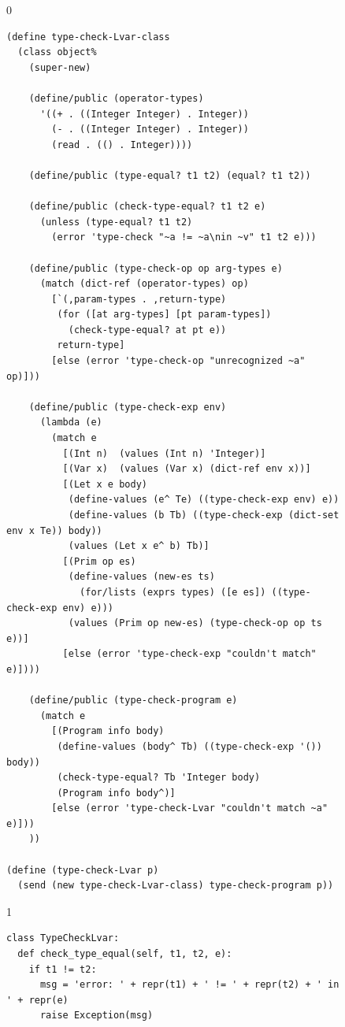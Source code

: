 \documentclass[7x10]{TimesAPriori_MIT}%
\def\racketEd{0}
\def\pythonEd{1}
\providecommand{\BookEdition}{1}
\let\edition\BookEdition
\newcommand{\pythonColor}[0]{}
\numberwithin{theorem}{chapter}
\numberwithin{definition}{chapter}
\numberwithin{equation}{chapter}
\begin{document}
\begin{figure}[tbp]
\begin{tcolorbox}[colback=white]
{\if\edition\racketEd  
\begin{lstlisting}[basicstyle=\ttfamily\footnotesize]
(define type-check-Lvar-class
  (class object%
    (super-new)

    (define/public (operator-types)
      '((+ . ((Integer Integer) . Integer))
        (- . ((Integer Integer) . Integer))
        (read . (() . Integer))))

    (define/public (type-equal? t1 t2) (equal? t1 t2))

    (define/public (check-type-equal? t1 t2 e)
      (unless (type-equal? t1 t2)
        (error 'type-check "~a != ~a\nin ~v" t1 t2 e)))

    (define/public (type-check-op op arg-types e)
      (match (dict-ref (operator-types) op)
        [`(,param-types . ,return-type)
         (for ([at arg-types] [pt param-types])
           (check-type-equal? at pt e))
         return-type]
        [else (error 'type-check-op "unrecognized ~a" op)]))

    (define/public (type-check-exp env)
      (lambda (e)
        (match e
          [(Int n)  (values (Int n) 'Integer)]
          [(Var x)  (values (Var x) (dict-ref env x))]
          [(Let x e body)
           (define-values (e^ Te) ((type-check-exp env) e))
           (define-values (b Tb) ((type-check-exp (dict-set env x Te)) body))
           (values (Let x e^ b) Tb)]
          [(Prim op es)
           (define-values (new-es ts)
             (for/lists (exprs types) ([e es]) ((type-check-exp env) e)))
           (values (Prim op new-es) (type-check-op op ts e))]
          [else (error 'type-check-exp "couldn't match" e)])))

    (define/public (type-check-program e)
      (match e
        [(Program info body)
         (define-values (body^ Tb) ((type-check-exp '()) body))
         (check-type-equal? Tb 'Integer body)
         (Program info body^)]
        [else (error 'type-check-Lvar "couldn't match ~a" e)]))
    ))

(define (type-check-Lvar p)
  (send (new type-check-Lvar-class) type-check-program p))
\end{lstlisting}
\fi}
{\if\edition\pythonEd\pythonColor
\begin{lstlisting}[escapechar=`]
class TypeCheckLvar:
  def check_type_equal(self, t1, t2, e):
    if t1 != t2:
      msg = 'error: ' + repr(t1) + ' != ' + repr(t2) + ' in ' + repr(e)
      raise Exception(msg)
          

\end{lstlisting}}
\end{tcolorbox}
\end{figure}
\end{document}
